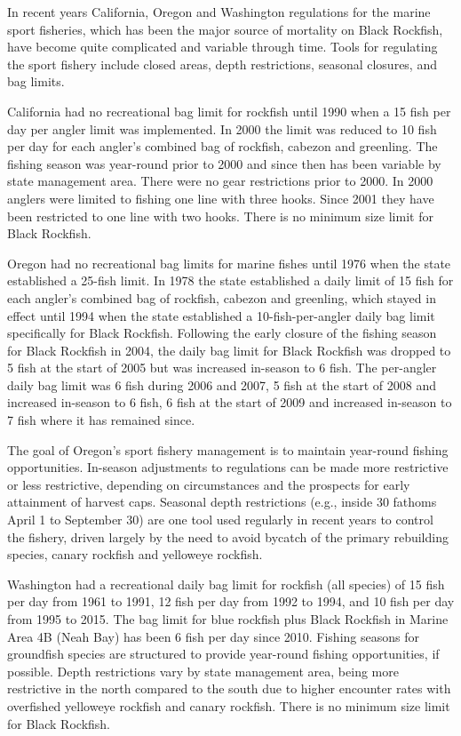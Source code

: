 \documentclass[11pt,
  english,
  letterpaper,
]{article}
\begin{document}
In recent years California, Oregon and Washington regulations for the marine sport fisheries, which has been the major source of mortality on Black Rockfish, have become quite complicated and variable through time. Tools for regulating the sport fishery include closed areas, depth restrictions, seasonal closures, and bag limits.

California had no recreational bag limit for rockfish until 1990 when a 15 fish per day per angler limit was implemented. In 2000 the limit was reduced to 10 fish per day for each angler's combined bag of rockfish, cabezon and greenling. The fishing season was year-round prior to 2000 and since then has been variable by state management area. There were no gear restrictions prior to 2000. In 2000 anglers were limited to fishing one line with three hooks. Since 2001 they have been restricted to one line with two hooks. There is no minimum size limit for Black Rockfish.

Oregon had no recreational bag limits for marine fishes until 1976 when the state established a 25-fish limit. In 1978 the state established a daily limit of 15 fish for each angler's combined bag of rockfish, cabezon and greenling, which stayed in effect until 1994 when the state established a 10-fish-per-angler daily bag limit specifically for Black Rockfish. Following the early closure of the fishing season for Black Rockfish in 2004, the daily bag limit for Black Rockfish was dropped to 5 fish at the start of 2005 but was increased in-season to 6 fish. The per-angler daily bag limit was 6 fish during 2006 and 2007, 5 fish at the start of 2008 and increased in-season to 6 fish, 6 fish at the start of 2009 and increased in-season to 7 fish where it has remained since.

The goal of Oregon's sport fishery management is to maintain year-round fishing opportunities. In-season adjustments to regulations can be made more restrictive or less restrictive, depending on circumstances and the prospects for early attainment of harvest caps. Seasonal depth restrictions (e.g., inside 30 fathoms April 1 to September 30) are one tool used regularly in recent years to control the fishery, driven largely by the need to avoid bycatch of the primary rebuilding species, canary rockfish and yelloweye rockfish.

Washington had a recreational daily bag limit for rockfish (all species) of 15 fish per day from 1961 to 1991, 12 fish per day from 1992 to 1994, and 10 fish per day from 1995 to 2015. The bag limit for blue rockfish plus Black Rockfish in Marine Area 4B (Neah Bay) has been 6 fish per day since 2010. Fishing seasons for groundfish species are structured to provide year-round fishing opportunities, if possible. Depth restrictions vary by state management area, being more restrictive in the north compared to the south due to higher encounter rates with overfished yelloweye rockfish and canary rockfish. There is no minimum size limit for Black Rockfish.
\end{document}
